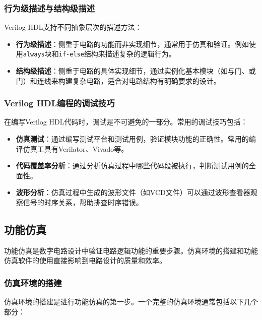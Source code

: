 \subsubsection{行为级描述与结构级描述}\label{sec:03-digital-logic-022}

Verilog HDL支持不同抽象层次的描述方法：

\begin{itemize}
\tightlist
\item
  \textbf{行为级描述}：侧重于电路的功能而非实现细节，通常用于仿真和验证。例如使用\texttt{always}块和\texttt{if-else}结构来描述复杂的逻辑行为。
\item
  \textbf{结构级描述}：侧重于电路的具体实现细节，通过实例化基本模块（如与门、或门）和连线来构建复杂电路，适合对电路结构有明确要求的设计。
\end{itemize}

\subsubsection{Verilog HDL编程的调试技巧}\label{sec:03-digital-logic-023}

在编写Verilog HDL代码时，调试是不可避免的一部分。常用的调试技巧包括：

\begin{itemize}
\tightlist
\item
  \textbf{仿真测试}：通过编写测试平台和测试用例，验证模块功能的正确性。常用的编译仿真工具有Verilator、Vivado等。
\item
  \textbf{代码覆盖率分析}：通过分析仿真过程中哪些代码段被执行，判断测试用例的全面性。
\item
  \textbf{波形分析}：仿真过程中生成的波形文件（如VCD文件）可以通过波形查看器观察信号的时序关系，帮助排查时序错误。
\end{itemize}

\subsection{功能仿真}\label{sec:03-digital-logic-024}

功能仿真是数字电路设计中验证电路逻辑功能的重要步骤。仿真环境的搭建和功能仿真软件的使用直接影响到电路设计的质量和效率。

\subsubsection{仿真环境的搭建}\label{sec:03-digital-logic-025}

仿真环境的搭建是进行功能仿真的第一步。一个完整的仿真环境通常包括以下几个部分：

